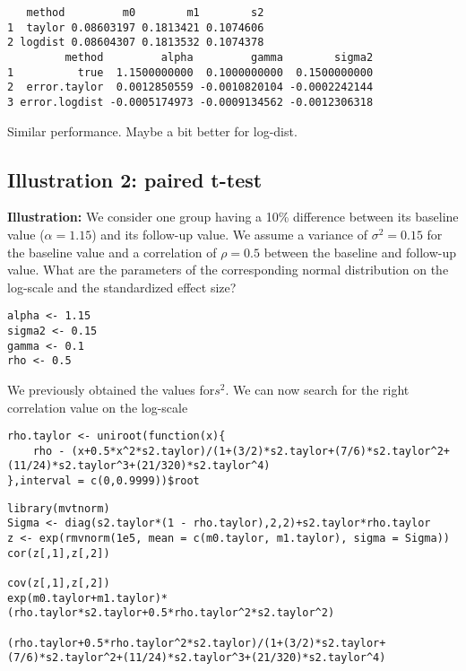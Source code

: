 \documentclass[12pt]{article}
\begin{document}
\begin{verbatim}
   method         m0        m1        s2
1  taylor 0.08603197 0.1813421 0.1074606
2 logdist 0.08604307 0.1813532 0.1074378
         method         alpha         gamma        sigma2
1          true  1.1500000000  0.1000000000  0.1500000000
2  error.taylor  0.0012850559 -0.0010820104 -0.0002242144
3 error.logdist -0.0005174973 -0.0009134562 -0.0012306318
\end{verbatim}
Similar performance. Maybe a bit better for log-dist.

\subsection{Illustration 2: paired t-test}
\label{sec:org9c71eac}

\textbf{Illustration:} We consider one group having a 10\% difference
between its baseline value (\(\alpha=1.15\)) and its follow-up
value. We assume a variance of \(\sigma^2 = 0.15\) for the baseline
value and a correlation of \(\rho=0.5\) between the baseline and
follow-up value. What are the parameters of the corresponding normal
distribution on the log-scale and the standardized effect size?
\lstset{language=r,label= ,caption= ,captionpos=b,numbers=none}
\begin{lstlisting}
alpha <- 1.15
sigma2 <- 0.15
gamma <- 0.1
rho <- 0.5
\end{lstlisting}

We previously obtained the values for\(s^2\). We can now search for
the right correlation value on the log-scale
\lstset{language=r,label= ,caption= ,captionpos=b,numbers=none}
\begin{lstlisting}
rho.taylor <- uniroot(function(x){
    rho - (x+0.5*x^2*s2.taylor)/(1+(3/2)*s2.taylor+(7/6)*s2.taylor^2+(11/24)*s2.taylor^3+(21/320)*s2.taylor^4)
},interval = c(0,0.9999))$root
\end{lstlisting}

\lstset{language=r,label= ,caption= ,captionpos=b,numbers=none}
\begin{lstlisting}
library(mvtnorm)
Sigma <- diag(s2.taylor*(1 - rho.taylor),2,2)+s2.taylor*rho.taylor
z <- exp(rmvnorm(1e5, mean = c(m0.taylor, m1.taylor), sigma = Sigma))
cor(z[,1],z[,2])

cov(z[,1],z[,2])
exp(m0.taylor+m1.taylor)*(rho.taylor*s2.taylor+0.5*rho.taylor^2*s2.taylor^2)

(rho.taylor+0.5*rho.taylor^2*s2.taylor)/(1+(3/2)*s2.taylor+(7/6)*s2.taylor^2+(11/24)*s2.taylor^3+(21/320)*s2.taylor^4)
\end{lstlisting}
\end{document}
